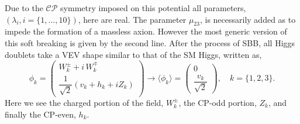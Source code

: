 %
 Due to the $\mathcal{CP}$ symmetry imposed on this potential all parameters, $(\lambda_i,i=\{1,...,10\})$, here are real.
%
The parameter $\mu_{23}$, is necessarily added as to impede the formation of a massless axion.
%
However the most generic version of this soft breaking is given by the second line. 
%
After the process of SBB, all Higgs doublets take a VEV shape similar to that of the SM Higgs, written as, 
%
\begin{equation}
\phi_k = 
\begin{pmatrix}
W_k^\pm + i \, W_k^\mp \\ 
\dfrac{1}{\sqrt{2}}\left( v_k + h_k + i Z_k \right)
\end{pmatrix}  \rightarrow \langle \phi_k \rangle = \begin{pmatrix}
0 \\ 
\dfrac{v_k}{\sqrt{2}}
\end{pmatrix}, \quad k=\{ 1,2,3\} .
\label{eq:3HDM_Higgs_Field_VEV}
\end{equation} 
Here we see the charged portion of the field, $W_k^\pm$, the CP-odd portion, $Z_k$, and finally the CP-even, $h_k$. 

